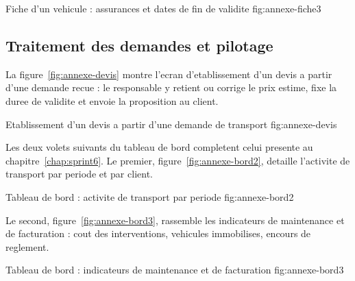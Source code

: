   {Fiche d'un vehicule : assurances et dates de fin de validite}
  {fig:annexe-fiche3}

\subsection*{Traitement des demandes et pilotage}

La figure~\ref{fig:annexe-devis} montre l'ecran d'etablissement d'un devis
a partir d'une demande recue : le responsable y retient ou corrige le prix
estime, fixe la duree de validite et envoie la proposition au client.

  {Etablissement d'un devis a partir d'une demande de transport}
  {fig:annexe-devis}

Les deux volets suivants du tableau de bord completent celui presente au
chapitre~\ref{chap:sprint6}. Le premier, figure~\ref{fig:annexe-bord2},
detaille l'activite de transport par periode et par client.

  {Tableau de bord : activite de transport par periode}
  {fig:annexe-bord2}

Le second, figure~\ref{fig:annexe-bord3}, rassemble les indicateurs de
maintenance et de facturation : cout des interventions, vehicules
immobilises, encours de reglement.

  {Tableau de bord : indicateurs de maintenance et de facturation}
  {fig:annexe-bord3}

